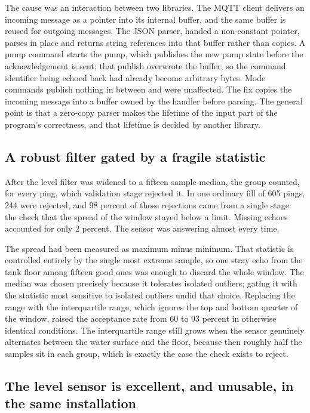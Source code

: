 The cause was an interaction between two libraries. The MQTT client delivers an incoming message as a pointer into its internal buffer, and the same buffer is reused for outgoing messages. The JSON parser, handed a non-constant pointer, parses in place and returns string references into that buffer rather than copies. A pump command starts the pump, which publishes the new pump state before the acknowledgement is sent; that publish overwrote the buffer, so the command identifier being echoed back had already become arbitrary bytes. Mode commands publish nothing in between and were unaffected. The fix copies the incoming message into a buffer owned by the handler before parsing. The general point is that a zero-copy parser makes the lifetime of the input part of the program's correctness, and that lifetime is decided by another library.

\subsection{A robust filter gated by a fragile statistic}

After the level filter was widened to a fifteen sample median, the group counted, for every ping, which validation stage rejected it. In one ordinary fill of 605 pings, 244 were rejected, and 98 percent of those rejections came from a single stage: the check that the spread of the window stayed below a limit. Missing echoes accounted for only 2 percent. The sensor was answering almost every time.

The spread had been measured as maximum minus minimum. That statistic is controlled entirely by the single most extreme sample, so one stray echo from the tank floor among fifteen good ones was enough to discard the whole window. The median was chosen precisely because it tolerates isolated outliers; gating it with the statistic most sensitive to isolated outliers undid that choice. Replacing the range with the interquartile range, which ignores the top and bottom quarter of the window, raised the acceptance rate from 60 to 93 percent in otherwise identical conditions. The interquartile range still grows when the sensor genuinely alternates between the water surface and the floor, because then roughly half the samples sit in each group, which is exactly the case the check exists to reject.

\subsection{The level sensor is excellent, and unusable, in the same installation}

